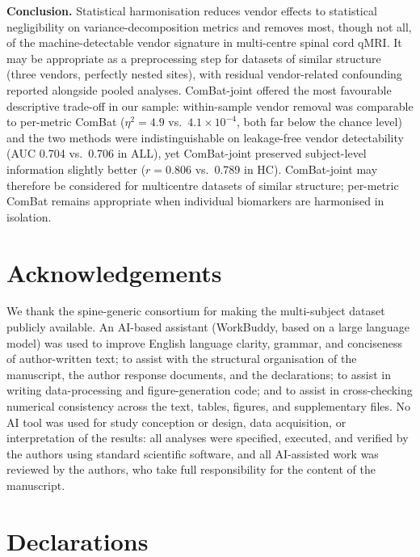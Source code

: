 \documentclass[12pt,a4paper]{article}
\begin{document}
\textbf{Conclusion.} Statistical harmonisation reduces vendor effects to statistical negligibility on variance-decomposition metrics and removes most, though not all, of the machine-detectable vendor signature in multi-centre spinal cord qMRI. It may be appropriate as a preprocessing step for datasets of similar structure (three vendors, perfectly nested sites), with residual vendor-related confounding reported alongside pooled analyses. ComBat-joint offered the most favourable descriptive trade-off in our sample: within-sample vendor removal was comparable to per-metric ComBat ($\eta^2=4.9$ vs.\ $4.1\times10^{-4}$, both far below the chance level) and the two methods were indistinguishable on leakage-free vendor detectability (AUC 0.704 vs.\ 0.706 in ALL), yet ComBat-joint preserved subject-level information slightly better ($r=0.806$ vs.\ 0.789 in HC). ComBat-joint may therefore be considered for multicentre datasets of similar structure; per-metric ComBat remains appropriate when individual biomarkers are harmonised in isolation.

\section*{Acknowledgements}

We thank the spine-generic consortium for making the multi-subject dataset publicly available. An AI-based assistant (WorkBuddy, based on a large language model) was used to improve English language clarity, grammar, and conciseness of author-written text; to assist with the structural organisation of the manuscript, the author response documents, and the declarations; to assist in writing data-processing and figure-generation code; and to assist in cross-checking numerical consistency across the text, tables, figures, and supplementary files. No AI tool was used for study conception or design, data acquisition, or interpretation of the results: all analyses were specified, executed, and verified by the authors using standard scientific software, and all AI-assisted work was reviewed by the authors, who take full responsibility for the content of the manuscript.

\section*{Declarations}
\end{document}
